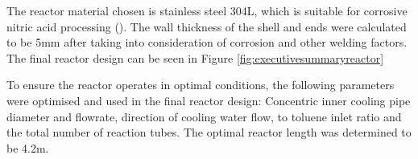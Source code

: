 The reactor material chosen is stainless steel 304L, which is suitable for corrosive nitric acid processing (). The wall thickness of the shell and ends were calculated to be 5mm after taking into consideration of corrosion and other welding factors. The final reactor design can be seen in Figure \ref{fig:executivesummaryreactor}



To ensure the reactor operates in optimal conditions, the following parameters were optimised and used in the final reactor design: Concentric inner cooling pipe diameter and flowrate, direction of cooling water flow,  to toluene inlet ratio and the total number of reaction tubes. %
The optimal reactor length was determined to be 4.2m. 


